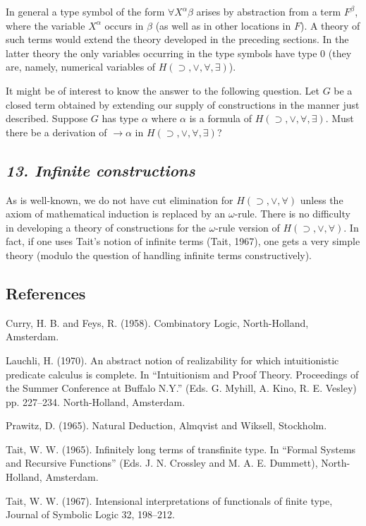 \documentclass[12pt]{article}
\def\imp{\rightarrow}
\def\limp{\supset}
\def\a{\alpha}
\def\b{\beta}
\def\HIMP{H(\limp, \lor, \forall)}
\def\HIMPE{H(\limp, \lor, \forall, \exists)}
\begin{document}
In general a type symbol of the form $\forall X^ \a\b$ arises by abstraction from a term $F^\b$, where the variable $X^\a$ occurs in $\b$ (as well as in other locations in $F$). A theory of such terms would extend the theory developed in the preceding sections. In the latter theory the only variables occurring in the type symbols have type $0$ (they are, namely, numerical variables of $\HIMPE$).


It might be of interest to know the answer to the following question. Let $G$ be a closed term obtained by extending our supply of constructions in the manner just described. Suppose $G$ has type $\a$ where $\a$ is a formula of $\HIMPE$. Must there be a derivation of $\imp \a$ in $\HIMPE$?


\subsection{\it 13. Infinite constructions}

As is well-known, we do not have cut elimination for $\HIMP$ unless the axiom of mathematical induction is replaced by an $\omega$-rule.
There is no difficulty in developing a theory of constructions for the $\omega$-rule version of $\HIMP$. 
In fact, if one uses Tait's notion of infinite terms (Tait, 1967), one gets a very simple theory (modulo the question of handling infinite terms constructively).

\newpage

\renewcommand{\refname}{}

\subsection{\rm References}

\vskip-20pt

\begin{thebibliography}{9}


 Curry, H. B. and Feys, R. (1958). Combinatory Logic, North-Holland, Amsterdam.

 Lauchli, H. (1970). An abstract notion of realizability for which intuitionistic predicate calculus is complete. In ``Intuitionism and Proof Theory. Proceedings of the Summer Conference at Buﬀalo N.Y.'' (Eds. G. Myhill, A. Kino, R. E. Vesley) pp. 227–234. North-Holland, Amsterdam.

 Prawitz, D. (1965). Natural Deduction, Almqvist and Wiksell, Stockholm.

 Tait, W. W. (1965). Infinitely long terms of transfinite type. In ``Formal Systems and Recursive Functions'' (Eds. J. N. Crossley and M. A. E. Dummett), North-Holland, Amsterdam.

 Tait, W. W. (1967). Intensional interpretations of functionals of finite type, Journal of Symbolic Logic 32, 198–212.

\end{thebibliography}
\end{document}
